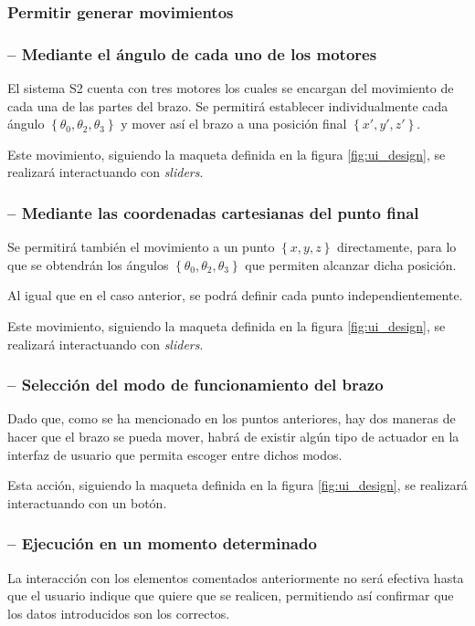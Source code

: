\subsubsection{Permitir generar movimientos}
\subsubsection*{ -- Mediante el ángulo de cada uno de los motores}
El sistema \ac{S2} cuenta con tres motores los cuales se encargan del movimiento de cada una de las partes del
brazo. Se permitirá establecer individualmente cada ángulo $\left\{\theta_0, \theta_2, \theta_3\right\}$ 
y mover así el brazo a una posición final $\left\{x', y', z'\right\}$.

Este movimiento, siguiendo la maqueta definida en la figura \ref{fig:ui_design}, se realizará interactuando
con \textit{sliders}.

\subsubsection*{ -- Mediante las coordenadas cartesianas del punto final}
Se permitirá también el movimiento a un punto $\left\{x, y, z\right\}$ directamente, para lo que se obtendrán
los ángulos $\left\{\theta_0, \theta_2, \theta_3\right\}$ que permiten alcanzar dicha posición.

Al igual que en el caso anterior, se podrá definir cada punto independientemente.

Este movimiento, siguiendo la maqueta definida en la figura \ref{fig:ui_design}, se realizará interactuando
con \textit{sliders}.

\subsubsection*{ -- Selección del modo de funcionamiento del brazo}
Dado que, como se ha mencionado en los puntos anteriores, hay dos maneras de hacer que el brazo se pueda
mover, habrá de existir algún tipo de actuador en la interfaz de usuario que permita escoger entre dichos modos.

Esta acción, siguiendo la maqueta definida en la figura \ref{fig:ui_design}, se realizará interactuando con
un botón.

\subsubsection*{ -- Ejecución en un momento determinado}
La interacción con los elementos comentados anteriormente no será efectiva hasta que el usuario indique que
quiere que se realicen, permitiendo así confirmar que los datos introducidos son los correctos.

